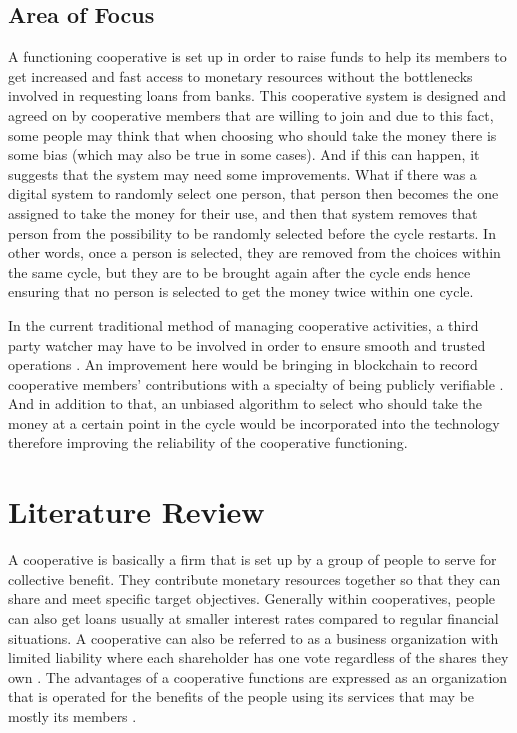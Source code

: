 \documentclass{article}
\begin{document}
\begin{flushleft}
\subsection{Area of Focus}
A functioning cooperative is set up in order to raise funds to help its members to get increased and fast access to monetary resources without the bottlenecks involved in requesting loans from banks. This cooperative system is designed and agreed on by cooperative members that are willing to join and due to this fact, some people may think that when choosing who should take the money there is some bias (which may also be true in some cases). And if this can happen, it suggests that the system may need some improvements. What if there was a digital system to randomly select one person, that person then becomes the one assigned to take the money for their use, and then that system removes that person from the possibility to be randomly selected before the cycle restarts. In other words, once a person is selected, they are removed from the choices within the same cycle, but they are to be brought again after the cycle ends hence ensuring that no person is selected to get the money twice within one cycle.

In the current traditional method of managing cooperative activities, a third party watcher may have to be involved in order to ensure smooth and trusted operations \cite{nair2018blockchain}. An improvement here would be bringing in blockchain to record cooperative members’ contributions with a specialty of being publicly verifiable \cite{nair2018blockchain}. And in addition to that, an unbiased algorithm to select who should take the money at a certain point in the cycle would be incorporated into the technology therefore improving the reliability of the cooperative functioning. 

\section{Literature Review}
A cooperative is basically a firm that is set up by a group of people to serve for collective benefit. They contribute monetary resources together so that they can share and meet specific target objectives. Generally within cooperatives, people can also get loans usually at smaller interest rates compared to regular financial situations. A cooperative can also be referred to as a business organization with limited liability where each shareholder has one vote regardless of the shares they own \cite{credo22393191}. The advantages of a cooperative functions are expressed as an organization that is operated for the benefits of the people using its services that may be mostly its members \cite{credo17700186}.


\end{flushleft}
\end{document}

